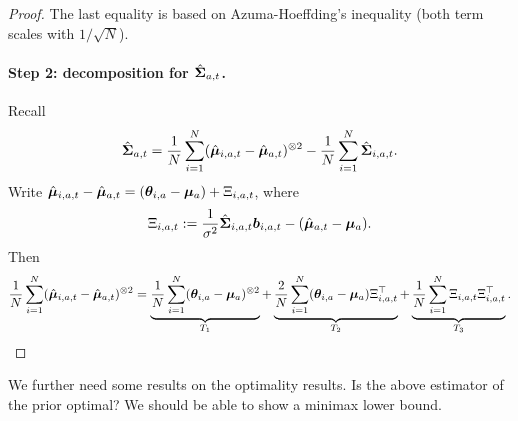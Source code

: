 \documentclass{article}
\begin{document}
\begin{proof}
The last equality is based on Azuma-Hoeffding's inequality (both term scales with $1/\sqrt{N}$).


\paragraph{Step 2: decomposition for \(\hat{{\bm{\Sigma}}}_{a,t}\).}
Recall
\[
\hat{{\bm{\Sigma}}}_{a,t}
=\frac{1}{N}\sum_{i=1}^N(\hat{{\bm{\mu}}}_{i,a,t}-\hat{{\bm{\mu}}}_{a,t})^{\otimes 2}
-\frac{1}{N}\sum_{i=1}^N\hat{{\bm{\Sigma}}}_{i,a,t}.
\]
Write
\(\hat{{\bm{\mu}}}_{i,a,t}-\hat{{\bm{\mu}}}_{a,t} = ({\bm{\theta}}_{i,a}-{\bm{\mu}}_a) + \Xi_{i,a,t}\),
where
\[
\Xi_{i,a,t}
:= \frac{1}{\sigma^2} \hat {{\bm{\Sigma}}}_{i, a, t} {\bm{b}}_{i, a, t} - (\hat{{\bm{\mu}}}_{a,t}-{\bm{\mu}}_a).
\]
Then
\begin{equation}\label{eq:Sigma-split}
\frac{1}{N}\sum_{i=1}^N(\hat{{\bm{\mu}}}_{i,a,t}-\hat{{\bm{\mu}}}_{a,t})^{\otimes 2}
=\underbrace{\frac{1}{N}\sum_{i=1}^N({\bm{\theta}}_{i,a}-{\bm{\mu}}_a)^{\otimes 2}}_{T_1}
+\underbrace{\frac{2}{N}\sum_{i=1}^N({\bm{\theta}}_{i,a}-{\bm{\mu}}_a)\Xi_{i,a,t}^\top}_{T_2}
+\underbrace{\frac{1}{N}\sum_{i=1}^N\Xi_{i,a,t}\Xi_{i,a,t}^\top}_{T_3}.
\end{equation}

\end{proof}
    

We further need some results on the optimality results. Is the above estimator of the prior optimal? We should be able to show a minimax lower bound.


\end{document}
